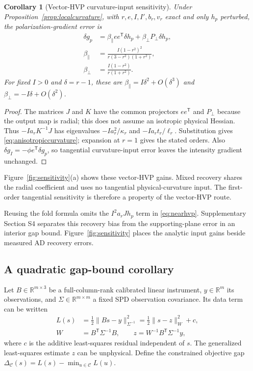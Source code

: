 \documentclass[pdflatex,sn-mathphys-num]{sn-jnl}
\newtheorem{corollary}[theorem]{Corollary}
\begin{document}
\begin{corollary}[Vector-HVP curvature-input sensitivity]
\label{cor:anisotropy}
Under Proposition~\ref{prop:localcurvature}, with $r,e,I,I',b_r,v_r$ exact and only $h_p$ perturbed, the polarization-gradient error is
\begin{equation}
 \begin{aligned}
 \delta g_p&=\beta_{\parallel}ee^{\mathsf T}\delta h_p
             +\beta_{\perp}P_\perp\delta h_p,\\
 \beta_{\parallel}&=\frac{I(1-r^2)^2}{r(3-r^2)(1+r^2)},\\
 \beta_{\perp}&=\frac{I(1-r^2)}{r(1+r^2)}.
 \end{aligned}
 \label{eq:anisotropiccurvature}
\end{equation}
For fixed $I>0$ and $\delta=r-1$, these are $\beta_{\parallel}=I\delta^2+O(\delta^3)$ and $\beta_{\perp}=-I\delta+O(\delta^2)$.
\end{corollary}
\begin{proof}
The matrices $J$ and $K$ have the common projectors $ee^{\mathsf T}$ and $P_\perp$ because the output map is radial; this does not assume an isotropic physical Hessian. Thus $-Ia_rK^{-1}J$ has eigenvalues $-Ia_r^2/\kappa_r$ and $-Ia_rt_r/\ell_r$. Substitution gives \eqref{eq:anisotropiccurvature}; expansion at $r=1$ gives the stated orders. Also $\delta g_I=-\phi e^{\mathsf T}\delta g_p$, so tangential curvature-input error leaves the intensity gradient unchanged.
\end{proof}
Figure~\ref{fig:sensitivity}(a) shows these vector-HVP gains. Mixed recovery shares the radial coefficient and uses no tangential physical-curvature input. The first-order tangential sensitivity is therefore a property of the vector-HVP route.

Reusing the fold formula omits the $I^2a_rJh_p$ term in \eqref{eq:nearhvp}. Supplementary Section S4 separates this recovery bias from the supporting-plane error in an interior gap bound. Figure~\ref{fig:sensitivity} places the analytic input gains beside measured AD recovery errors.




\subsection{A quadratic gap-bound corollary}
\label{sec:gap}
Let $B\in\mathbb R^{m\times3}$ be a full-column-rank calibrated linear instrument, $y\in\mathbb R^m$ its observations, and $\Sigma\in\mathbb R^{m\times m}$ a fixed SPD observation covariance. Its data term can be written
\begin{equation}
 \begin{aligned}
 L(s)&=\tfrac12\|Bs-y\|_{\Sigma^{-1}}^2
       =\tfrac12\|s-z\|_W^2+c,\\
 W&=B^{\mathsf T}\Sigma^{-1}B,\qquad
 z=W^{-1}B^{\mathsf T}\Sigma^{-1}y,
 \end{aligned}
 \label{eq:calibrated}
\end{equation}
where $c$ is the additive least-squares residual independent of $s$. The generalized least-squares estimate $z$ can be unphysical. Define the constrained objective gap $\Delta_{\mathcal C}(s)=L(s)-\min_{u\in\mathcal C}L(u)$.
\end{document}
